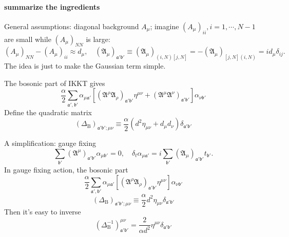 
\paragraph{summarize the ingredients}
General assumptions:
diagonal background $A_\mu$; imagine $(A_\mu)_{ii},i=1,\cdots,N-1$ are small
while $(A_\mu)_{NN}$ is large:
\[
	(A_\mu)_{NN} - (A_\mu)_{ii} \approx d_\mu,\quad
	(\mathfrak{A}_\mu)_{\mathfrak{a}'\mathfrak{b}'}\equiv
	(\mathfrak{A}_\mu)_{(i,N)[j,N]}
	= - (\mathfrak{A}_\mu)_{[j,N](i,N)}
	= i d_\mu \delta_{ij}
.\] 
The idea is just to make the Gaussian term simple.

The bosonic part of IKKT gives
\begin{equation}
	\frac{\alpha}{2} \sum_{\mathfrak{a}',\mathfrak{b}'}
	\alpha_{\mu \mathfrak{a}'}
	\left[ 
	(\mathfrak{A}^\rho \mathfrak{A}_\rho)_{\mathfrak{a}'\mathfrak{b}'}
\eta^{\mu\nu} + (\mathfrak{A}^\mu \mathfrak{A}^\nu)_{\mathfrak{a}' \mathfrak{b}'}
\right] 
\alpha_{\nu \mathfrak{b}'}
\end{equation}
Define the quadratic matrix
\begin{equation}
	(\Delta_{\mathrm{B}})_{\mathfrak{a}' \mathfrak{b}';\mu\nu}
	\equiv \frac{\alpha}{2} ( d^2 \eta_{\mu\nu} + d_\mu d_\nu)
	\delta_{\mathfrak{a}' \mathfrak{b}'}	
\end{equation}

A simplification: gauge fixing
\[
	\sum_{\mathfrak{b}'}
	(\mathfrak{A}^\mu)_{\mathfrak{a}'\mathfrak{b}'} \alpha_{\mu \mathfrak{b}'}
	=0,\quad
	\delta_t \alpha_{\mu \mathfrak{a}'} = i \sum_{\mathfrak{b}'} 
	(\mathfrak{A}_\mu)_{\mathfrak{a}'
	\mathfrak{b}'} t_{\mathfrak{b}'}
.\] 
In gauge fixing action, the bosonic part
\begin{equation}
	\frac{\alpha}{2} \sum_{\mathfrak{a}',\mathfrak{b}'}
	\alpha_{\mu \mathfrak{a}'}
	\left[ 
	(\mathfrak{A}^\rho \mathfrak{A}_\rho)_{\mathfrak{a}'\mathfrak{b}'}
\eta^{\mu\nu} \right] 
\alpha_{\nu \mathfrak{b}'}
\end{equation}
\begin{equation}
	(\Delta_{\mathrm{B}})_{\mathfrak{a}' \mathfrak{b}';\mu\nu}
	\equiv \frac{\alpha}{2}  d^2 \eta_{\mu\nu}  
	\delta_{\mathfrak{a}' \mathfrak{b}'}
\end{equation}
Then it's easy to inverse
\begin{equation}
	(\Delta^{-1}_{\mathrm{B}} )^{\mu\nu}_{\mathfrak{a}'\mathfrak{b}'}
	= \frac{2}{\alpha d^2} \eta^{\mu\nu} 
	\delta_{\mathfrak{a}' \mathfrak{b}'}
\end{equation}

